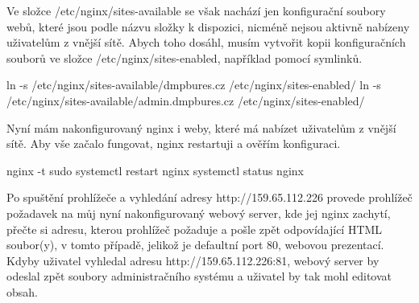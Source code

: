 \documentclass[12pt,a4paper]{report}
\begin{document}
  Ve složce /etc/nginx/sites-available se však nachází jen konfigurační soubory webů,
  které jsou podle názvu složky k dispozici, nicméně nejsou aktivně nabízeny uživatelům z vnější sítě. 
  Abych toho dosáhl, musím vytvořit kopii konfiguračních souborů ve složce /etc/nginx/sites-enabled, například pomocí symlinků.

  \begin{bash}
    ln -s /etc/nginx/sites-available/dmpbures.cz 
    /etc/nginx/sites-enabled/
    ln -s /etc/nginx/sites-available/admin.dmpbures.cz
     /etc/nginx/sites-enabled/
  \end{bash}

  Nyní mám nakonfigurovaný nginx i weby, které má nabízet uživatelům z vnější sítě.
  Aby vše začalo fungovat, nginx restartuji a ověřím konfiguraci.
  \begin{bash}
    nginx -t
    sudo systemctl restart nginx
    systemctl status nginx
  \end{bash}

  Po spuštění prohlížeče a vyhledání adresy http://159.65.112.226 provede prohlížeč
  požadavek na můj nyní nakonfigurovaný webový server, kde jej nginx zachytí, přečte si adresu, kterou prohlížeč požaduje a 
  pošle zpět odpovídající HTML soubor(y), v tomto případě, jelikož je defaultní port 80, webovou prezentací.
  Kdyby uživatel vyhledal adresu http://159.65.112.226:81, webový server by odeslal zpět soubory administračního systému a uživatel by tak mohl editovat 
  obsah.
\end{document}
